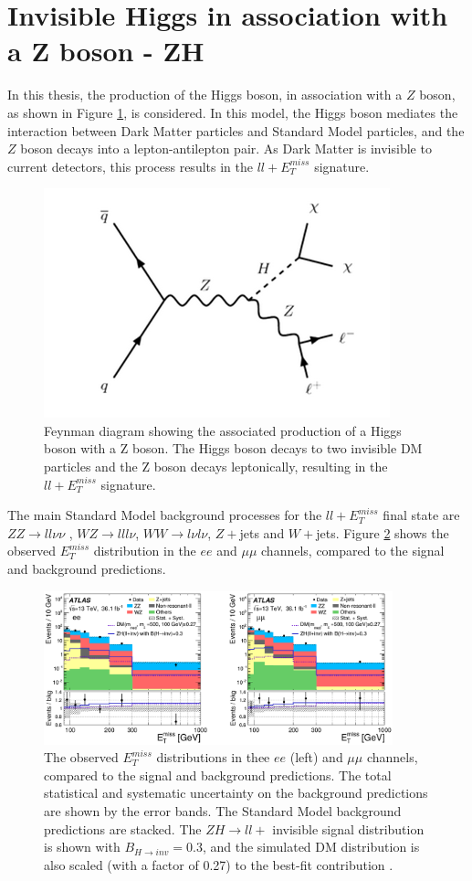 \documentclass[11pt,a4paper,openright,twoside]{report}
\newcommand{\ZZ}{$ZZ\to ll\nu\nu$ }
\newcommand{\met}{$E_T^{miss}$ }
\begin{document}
\section{Invisible Higgs in association with a Z boson - ZH}
In this thesis, the production of the Higgs boson, in association with a $Z$ boson, as shown in Figure \ref{fig:HZ}, is considered. In this model, the Higgs boson mediates the interaction between Dark Matter particles and Standard Model particles, and the $Z$ boson decays into a lepton-antilepton pair. As Dark Matter is invisible to current detectors, this process results in the $ll+$\met signature.
\begin{figure}[H]
\centering
	\includegraphics[width=0.5\linewidth]{HZ.png}
	\caption{Feynman diagram showing the associated production of a Higgs boson with a Z boson. The Higgs boson decays to two invisible DM particles and the Z boson decays leptonically, resulting in the $ll+ E_T^{miss}$ signature.}
		\label{fig:HZ}
\end{figure}
The main Standard Model background processes for the $ll+$\met final state are \ZZ, $WZ\to lll\nu$, $WW\to l\nu l\nu$, $Z+$jets and $W+$jets. Figure \ref{fig:ZH_results} shows the observed \met distribution in the $ee$ and $\mu\mu$ channels, compared to the signal and background predictions.
\begin{figure}[H]
\centering
		\includegraphics[width=0.9\textwidth]{ZH_results.png}
		\caption{The observed \met distributions in thee $ee$ (left) and $\mu\mu$ channels, compared to the signal and background predictions. The total statistical and systematic uncertainty on the background predictions are shown by the error bands. The Standard Model background predictions are stacked. The $ZH\to ll+$ invisible signal distribution is shown with $B_{H\to inv}=0.3$, and the simulated DM distribution is also scaled (with a factor of 0.27) to the best-fit contribution \cite{ZH_ATLAS}.}
		\label{fig:ZH_results}
\end{figure}
\end{document}
